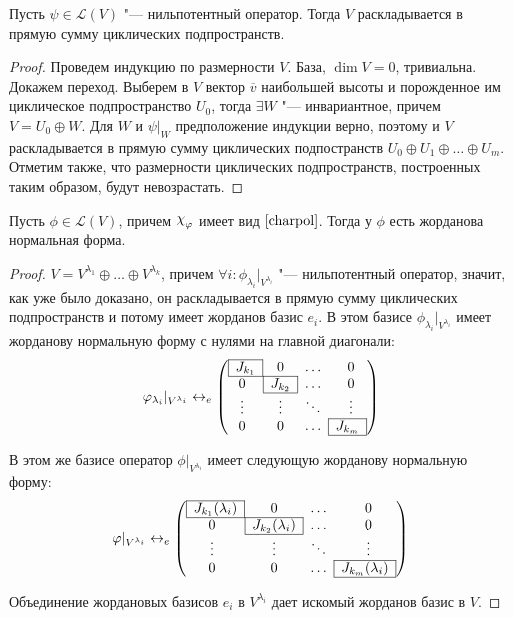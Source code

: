 \begin{corollary}
	Пусть $\psi \in \mathcal{L}(V)$ "--- нильпотентный оператор. Тогда $V$ раскладывается в прямую сумму циклических подпространств.
\end{corollary}

\begin{proof}
	Проведем индукцию по размерности $V$. База, $\dim{V} = 0$, тривиальна. Докажем переход. Выберем в $V$ вектор $\overline{v}$ наибольшей высоты и порожденное им циклическое подпространство $U_0$, тогда $\exists W$ "--- инвариантное, причем $V = U_0 \oplus W$. Для $W$ и $\psi|_W$ предположение индукции верно, поэтому и $V$ раскладывается в прямую сумму циклических подпостранств $U_0 \oplus U_1 \oplus \dots \oplus U_m$. Отметим также, что размерности циклических подпространств, построенных таким образом, будут невозрастать.
\end{proof}

\begin{theorem}
	Пусть $\phi \in \mathcal{L}(V)$, причем $\Chi_\phi$ имеет вид $\eqref*{charpol}$. Тогда у $\phi$ есть жорданова нормальная форма.
\end{theorem}

\begin{proof}
	$V = V^{\lambda_1} \oplus \dots \oplus V^{\lambda_k}$, причем $\forall i: \phi_{\lambda_i}|_{V^{\lambda_i}}$ "--- нильпотентный оператор, значит, как уже было доказано, он раскладывается в прямую сумму циклических подпространств и потому имеет жорданов базис $e_i$. В этом базисе $\phi_{\lambda_i}|_{V^{\lambda_i}}$ имеет жорданову нормальную форму с нулями на главной диагонали:
	\[\phi_{\lambda_i}|_{V^{\lambda_i}} \leftrightarrow_e \left(\begin{array}{@{}cccc@{}}
		\cline{1-1}
		\multicolumn{1}{|c|}{J_{k_1}} & 0 & \dots & 0\\
		\cline{1-2}
		0 & \multicolumn{1}{|c|}{J_{k_2}} & \dots & 0\\
		\cline{2-2}
		\vdots & \vdots & \ddots & \vdots\\
		\cline{4-4}
		0 & 0 & \dots & \multicolumn{1}{|c|}{J_{k_m}}\\
		\cline{4-4}
	\end{array}\right)\]
	
	В этом же базисе оператор $\phi|_{V^{\lambda_i}}$ имеет следующую жорданову нормальную форму:
	\[\phi|_{V^{\lambda_i}} \leftrightarrow_e \left(\begin{array}{@{}cccc@{}}
		\cline{1-1}
		\multicolumn{1}{|c|}{J_{k_1}(\lambda_i)} & 0 & \dots & 0\\
		\cline{1-2}
		0 & \multicolumn{1}{|c|}{J_{k_2}(\lambda_i)} & \dots & 0\\
		\cline{2-2}
		\vdots & \vdots & \ddots & \vdots\\
		\cline{4-4}
		0 & 0 & \dots & \multicolumn{1}{|c|}{J_{k_m}(\lambda_i)}\\
		\cline{4-4}
	\end{array}\right)\]
	
	Объединение жордановых базисов $e_i$ в $V^{\lambda_i}$ дает искомый жорданов базис в $V$.
\end{proof}

